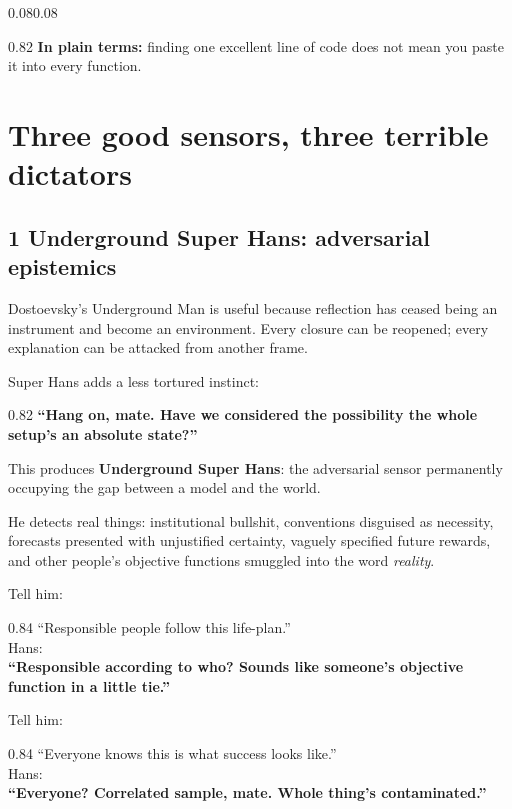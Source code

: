 \documentclass[10pt,letterpaper]{article}
\newenvironment{paperbody}
  {\begin{adjustwidth}{0.08\textwidth}{0.08\textwidth}\justifying}
  {\par\end{adjustwidth}}
\newenvironment{voicebox}
  {\Needspace{3.5\baselineskip}\par\vspace{0.22em}\begin{center}\begingroup
   \begin{lrbox}{\voiceboxsave}\begin{varwidth}{0.82\linewidth}
   \small\rmfamily\upshape\RaggedRight}
  {\end{varwidth}\end{lrbox}\fbox{\usebox{\voiceboxsave}}
   \endgroup\end{center}\vspace{0.22em}}
\newenvironment{dialoguebox}
  {\Needspace{5\baselineskip}\par\vspace{0.26em}\begin{center}\begingroup
   \begin{lrbox}{\dialogueboxsave}\begin{varwidth}{0.84\linewidth}
   \small\rmfamily\upshape\RaggedRight}
  {\end{varwidth}\end{lrbox}\fbox{\usebox{\dialogueboxsave}}
   \endgroup\end{center}\vspace{0.26em}}
\newenvironment{plainbox}
  {\Needspace{3.5\baselineskip}\par\vspace{0.24em}\begin{center}\begingroup
   \begin{lrbox}{\plainboxsave}\begin{varwidth}{0.82\linewidth}
   \small\rmfamily\upshape\RaggedRight}
  {\end{varwidth}\end{lrbox}\fbox{\usebox{\plainboxsave}}
   \endgroup\end{center}\vspace{0.24em}}
\let\oldsection\section
\renewcommand{\section}{\Needspace{6\baselineskip}\oldsection}
\let\oldsubsection\subsection
\renewcommand{\subsection}{\Needspace{5\baselineskip}\oldsubsection}
\begin{document}
\begin{paperbody}
\begin{plainbox}
\textbf{In plain terms:} finding one excellent line of code does not
mean you paste it into every function.
\end{plainbox}

\section{Three good sensors, three terrible
dictators}\label{three-good-sensors-three-terrible-dictators}

\subsection{1 Underground Super Hans: adversarial
epistemics}\label{underground-super-hans-adversarial-epistemics}

Dostoevsky's Underground Man is useful because reflection has ceased
being an instrument and become an environment. Every closure can be
reopened; every explanation can be attacked from another frame.

Super Hans adds a less tortured instinct:

\begin{voicebox}
\textbf{``Hang on, mate. Have we considered the possibility the whole
setup's an absolute state?''}
\end{voicebox}

This produces \textbf{Underground Super Hans}: the adversarial sensor
permanently occupying the gap between a model and the world.

He detects real things: institutional bullshit, conventions disguised as
necessity, forecasts presented with unjustified certainty, vaguely
specified future rewards, and other people's objective functions
smuggled into the word \emph{reality}.

Tell him:

\begin{dialoguebox}
``Responsible people follow this life-plan.''\\[0.35em]
Hans:\\
\textbf{``Responsible according to who? Sounds like someone's objective
function in a little tie.''}
\end{dialoguebox}

Tell him:

\begin{dialoguebox}
``Everyone knows this is what success looks like.''\\[0.35em]
Hans:\\
\textbf{``Everyone? Correlated sample, mate. Whole thing's
contaminated.''}
\end{dialoguebox}


\end{paperbody}
\end{document}

